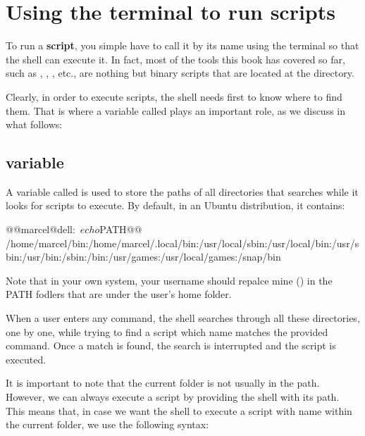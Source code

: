 \section{Using the terminal to run scripts}

To run a \textbf{script}, you simple have to call it by its name using the terminal so that the shell can execute it. In fact, most of the tools this book has covered so far, such as , , , etc., are nothing but binary scripts that are located at the  directory.

Clearly, in order to execute scripts, the shell needs first to know where to find them. That is where a variable called  plays an important role, as we discuss in what follows:

\subsection{ variable}

A variable called  is used to store the paths of all directories that  searches while it looks for scripts to execute. By default, in an Ubuntu distribution, it contains:

\begin{command_line}[Make]
@@marcel@dell:~$ echo $PATH@@
/home/marcel/bin:/home/marcel/.local/bin:/usr/local/sbin:/usr/local/bin:/usr/sbin:/usr/bin:/sbin:/bin:/usr/games:/usr/local/games:/snap/bin
\end{command_line}

Note that in your own system, your username should repalce mine () in the PATH fodlers that are under the user's home folder.

When a user enters any command, the shell searches through all these directories, one by one, while trying to find a script which name matches the provided command. Once a match is found, the search is interrupted and the script is executed.

It is important to note that the current folder is not usually in the path. However, we can always execute a script by providing the shell with its path. This means that, in case we want the shell to execute a script with name  within the current folder, we use the following syntax:

